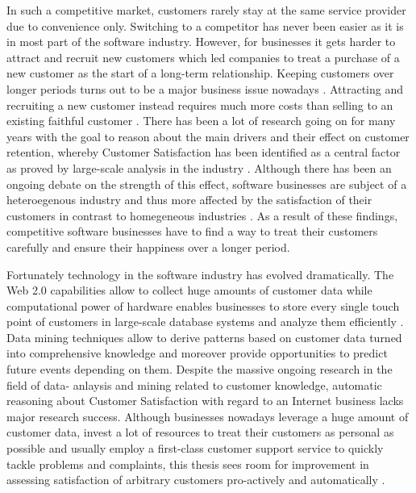In such a competitive market, customers rarely stay at the same service provider due to convenience only. Switching to a competitor has never been easier \cite{rygielski2002data} as it is in most part of the software industry. However, for businesses it gets harder to attract and recruit new customers which led companies to treat a purchase of a new customer as the start of a long-term relationship. Keeping customers over longer periods turns out to be a major business issue nowadays \cite{nerdinger2015} \cite{neckel2015}. Attracting and recruiting a new customer instead requires much more costs than selling to an existing faithful customer \cite{aydin2006switching}. There has been a lot of research going on for many years with the goal to reason about the main drivers and their effect on customer retention, whereby Customer Satisfaction has been identified as a central factor as proved by large-scale analysis in the industry \cite{fornell1992national} \cite{bolton1998dynamic} \cite{gustafsson2005effects}. Although there has been an ongoing debate on the strength of this effect, software businesses are subject of a heteroegenous industry and thus more affected by the satisfaction of their customers in contrast to homegeneous industries \cite{fornell1992national}. As a result of these findings, competitive software businesses have to find a way to treat their customers carefully and ensure their happiness over a longer period. 

Fortunately technology in the software industry has evolved dramatically. The Web 2.0 capabilities allow to collect huge amounts of customer data while computational power of hardware enables businesses to store every single touch point of customers in large-scale database systems and analyze them efficiently \cite{chen2003understanding} \cite{neckel2015}.  Data mining techniques allow to derive patterns based on customer data turned into comprehensive knowledge and moreover provide opportunities to predict future events depending on them. Despite the massive ongoing research in the field of data- anlaysis and mining related to customer knowledge, automatic reasoning about Customer Satisfaction with regard to an Internet business lacks major research success. Although businesses nowadays leverage a huge amount of customer data, invest a lot of resources to treat their customers as personal as possible and usually employ a first-class customer support service to quickly tackle problems and complaints, this thesis sees room for improvement in assessing satisfaction of arbitrary customers pro-actively and automatically \cite{neckel2015}.

